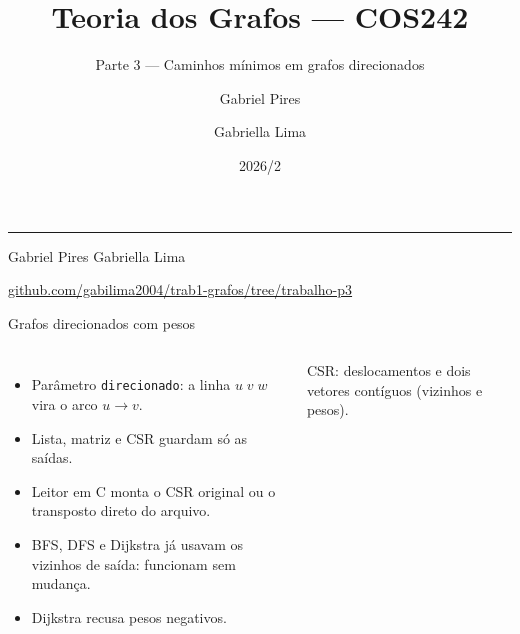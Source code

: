 \documentclass[10pt,aspectratio=169]{beamer}
\title{Teoria dos Grafos --- COS242}
\subtitle{Parte 3 --- Caminhos mínimos em grafos direcionados}
\author{Gabriel Pires \and Gabriella Lima}
\institute{Universidade Federal do Rio de Janeiro}
\date{2026/2}
\begin{document}
\begin{frame}
\vfill
{\LARGE\bfseries\color{cforte}\inserttitle\par}
\medskip
{\large\insertsubtitle\par}
\medskip
{\color{pyforte}\rule{\textwidth}{.7pt}\par}
\medskip
Gabriel Pires \quad Gabriella Lima\par
\insertinstitute\par
\insertdate\par
\medskip
\small\url{github.com/gabilima2004/trab1-grafos/tree/trabalho-p3}
\vfill
\end{frame}

\begin{frame}{Grafos direcionados com pesos}
\begin{columns}[T,onlytextwidth]
\begin{itemize}
\item Parâmetro \texttt{direcionado}: a linha \(u\;v\;w\) vira o arco \(u\to v\).
\item Lista, matriz e CSR guardam só as saídas.
\item Leitor em C monta o CSR original ou o \alert{transposto} direto do arquivo.
\item BFS, DFS e Dijkstra já usavam os vizinhos de saída: funcionam sem mudança.
\item Dijkstra recusa pesos negativos.
\end{itemize}
\centering
{}\par
\medskip
\small CSR: deslocamentos e dois vetores contíguos (vizinhos e pesos).
\end{columns}
\end{frame}
\end{document}
